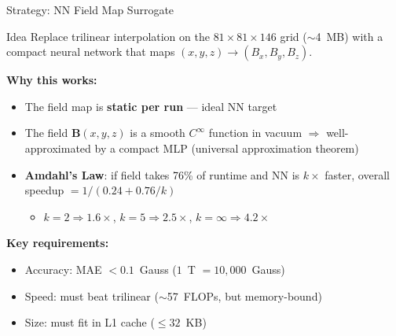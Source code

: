 \documentclass[aspectratio=169, 11pt]{beamer}
\newcommand{\bvec}[1]{\mathbf{#1}}
\begin{document}
\begin{frame}{Strategy: NN Field Map Surrogate}

\begin{block}{Idea}
  Replace trilinear interpolation on the $81\times81\times146$ grid
  ($\sim$4~MB) with a compact neural network that maps
  $(x,y,z) \to (B_x, B_y, B_z)$.
\end{block}

\vspace{4pt}
\textbf{Why this works:}
\begin{itemize}
  \item The field map is \textbf{static per run} --- ideal NN target
  \item The field $\bvec{B}(x,y,z)$ is a smooth $C^\infty$ function
        in vacuum $\Rightarrow$ well-approximated by a compact MLP
        (universal approximation theorem)
  \item \textbf{Amdahl's Law}: if field takes 76\% of runtime and NN is
        $k\times$ faster, overall speedup $= 1/(0.24 + 0.76/k)$
        \begin{itemize}
          \item $k=2 \Rightarrow 1.6\times$, \quad $k=5 \Rightarrow 2.5\times$,
                \quad $k=\infty \Rightarrow 4.2\times$
        \end{itemize}
\end{itemize}

\vspace{4pt}
\textbf{Key requirements:}
\begin{itemize}
  \item Accuracy: MAE $< 0.1$~Gauss ($1$~T $= 10{,}000$~Gauss)
  \item Speed: must beat trilinear ($\sim$57~FLOPs, but memory-bound)
  \item Size: must fit in L1 cache ($\leq 32$~KB)
\end{itemize}
\end{frame}
\end{document}
